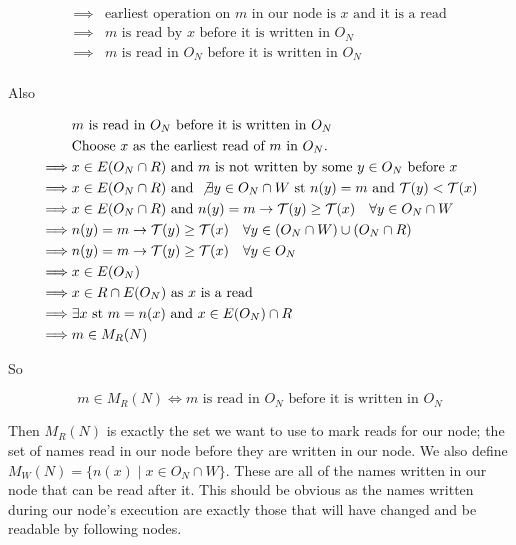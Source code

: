 \documentclass{report}
\begin{document}
\begin{align*}
\implies & \text{earliest operation on $m$ in our node is $x$ and it is a read} \\
\implies & \text{$m$ is read by $x$ before it is written in $O_N$} \\
\implies & \text{$m$ is read in $O_N$ before it is written in $O_N$} \\
\end{align*}

Also

\begin{align*}
         & \text{$m$ is read in $O_N$ before it is written in $O_N$} \\
         & \text{Choose $x$ as the earliest read of $m$ in $O_N$.} \\
\implies & x \in E(O_N \cap R) \text{ and $m$ is not written by some $y \in O_N$ before $x$} \\
\implies & x \in E(O_N \cap R) \text{ and } \not \exists y \in O_N \cap W \text{ st } n(y) = m \text{ and } \mathcal{T}(y) < \mathcal{T}(x) \\
\implies & x \in E(O_N \cap R) \text{ and } n(y) = m \rightarrow \mathcal{T}(y) \ge \mathcal{T}(x) \quad \forall y \in O_N \cap W \\
\implies & n(y) = m \rightarrow \mathcal{T}(y) \ge \mathcal{T}(x) \quad \forall y \in (O_N \cap W) \cup (O_N \cap R) \\
\implies & n(y) = m \rightarrow \mathcal{T}(y) \ge \mathcal{T}(x) \quad \forall y \in O_N \\
\implies & x \in E(O_N) \\
\implies & x \in R \cap E(O_N) \text{ as $x$ is a read} \\
\implies & \exists x \text{ st } m = n(x) \text{ and } x \in E(O_N) \cap R \\
\implies & m \in M_R(N)
\end{align*}

So

$$m \in M_R(N) \Leftrightarrow \text{$m$ is read in $O_N$ before it is written in $O_N$}$$

Then $M_R(N)$ is exactly the set we want to use to mark reads for our node; the set of names read in our node before they are written in our node. We also define
$M_W(N) = \{n(x) \mid x \in O_N \cap W \}$. These are all of the names written in our node that can be read after it. This should be obvious as the names written
during our node's execution are exactly those that will have changed and be readable by following nodes.
\end{document}
